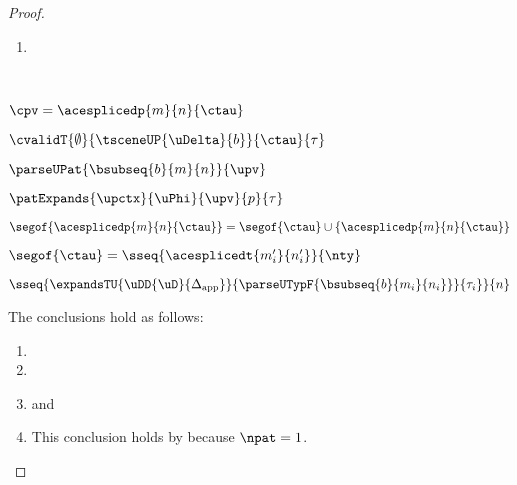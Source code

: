\begin{grayparbox}
\begin{proof}
\begin{byCases}
\begin{enumerate}
    \item {}
    \end{enumerate}
    \resetpfcounter
  \item[\text{(\ref{rule:cvalidP-UP-spliced})}] ~
    \begin{pfsteps*}
      \item $\cpv=\acesplicedp{m}{n}{\ctau}$ 
      \item $\cvalidT{\emptyset}{\tsceneUP{\uDelta}{b}}{\ctau}{\tau}$  
      \item $\parseUPat{\bsubseq{b}{m}{n}}{\upv}$  
      \item $\patExpands{\upctx}{\uPhi}{\upv}{p}{\tau}$  
      \item $\segof{\acesplicedp{m}{n}{\ctau}} = \segof{\ctau} \cup \{ \acesplicedp{m}{n}{\ctau} \}$  
      \item $\segof{\ctau} = \sseq{\acesplicedt{m'_i}{n'_i}}{\nty}$  
      \item $\sseq{\expandsTU{\uDD{\uD}{\Delta_\text{app}}}{
  \parseUTypF{\bsubseq{b}{m_i}{n_i}}
}{\tau_i}}{n}$  
    \end{pfsteps*}
    The conclusions hold as follows:
    \begin{enumerate}
      \item {}
      \item {}
      \item {} and 
      \item This conclusion holds by  because $\npat=1$.
    \end{enumerate}
    \resetpfcounter
\end{byCases}
\end{proof}


\end{grayparbox}

